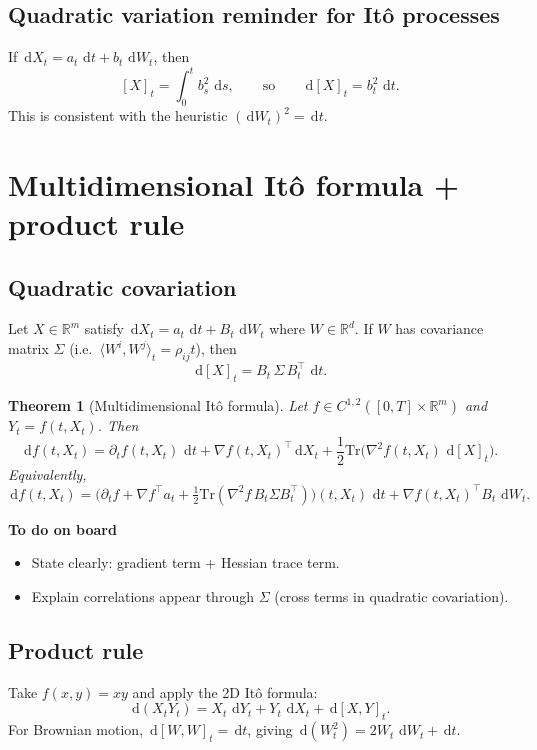 \documentclass[11pt]{article}
\newcommand{\R}{\mathbb{R}}
\newcommand{\1}{\mathbf{1}}
\newcommand{\dd}{\,\mathrm{d}}
\numberwithin{equation}{section}
\theoremstyle{plain}
\newtheorem{theorem}{Theorem}[section]
\theoremstyle{definition}
\theoremstyle{remark}
\begin{document}
\subsection{Quadratic variation reminder for It\^o processes}
If $\dd X_t=a_t\,\dd t+b_t\,\dd W_t$, then
\[
[X]_t=\int_0^t b_s^2\,\dd s,
\qquad\text{so}\qquad \dd[X]_t=b_t^2\,\dd t.
\]
This is consistent with the heuristic $(\dd W_t)^2=\dd t$.

\section{Multidimensional It\^o formula + product rule}

\subsection{Quadratic covariation}
Let $X\in\R^m$ satisfy $\dd X_t=a_t\,\dd t + B_t\,\dd W_t$ where $W\in\R^d$.
If $W$ has covariance matrix $\Sigma$ (i.e.\ $\langle W^i,W^j\rangle_t=\rho_{ij}t$),
then
\[
\dd[X]_t = B_t\,\Sigma\,B_t^\top\,\dd t.
\]

\begin{theorem}[Multidimensional It\^o formula]
Let $f\in C^{1,2}([0,T]\times\R^m)$ and $Y_t=f(t,X_t)$. Then
\[
\dd f(t,X_t)
=
\partial_t f(t,X_t)\,\dd t
+
\nabla f(t,X_t)^\top \dd X_t
+
\frac12 \mathrm{Tr}\!\big(\nabla^2 f(t,X_t)\,\dd[X]_t\big).
\]
Equivalently,
\[
\dd f(t,X_t)
=
\Big(\partial_t f+\nabla f^\top a_t+\tfrac12\mathrm{Tr}(\nabla^2 f\,B_t\Sigma B_t^\top)\Big)(t,X_t)\,\dd t
+
\nabla f(t,X_t)^\top B_t\,\dd W_t.
\]
\end{theorem}

\textbf{To do on board}
\begin{itemize}[leftmargin=2em]
  \item State clearly: gradient term + Hessian trace term.
  \item Explain correlations appear through $\Sigma$ (cross terms in quadratic covariation).
\end{itemize}


\subsection{Product rule}
Take $f(x,y)=xy$ and apply the 2D It\^o formula:
\[
\dd(X_tY_t)=X_t\,\dd Y_t + Y_t\,\dd X_t + \dd[X,Y]_t.
\]
For Brownian motion, $\dd[W,W]_t=\dd t$, giving $\dd(W_t^2)=2W_t\,\dd W_t+\dd t$.
\end{document}
